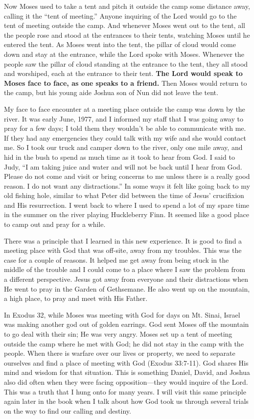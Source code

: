 \documentclass[twoside, 12pt]{book}
\begin{document}
Now Moses used to take a tent and pitch it outside the camp some distance away, calling it the “tent of meeting.” Anyone inquiring of the Lord would go to the tent of meeting outside the camp. And whenever Moses went out to the tent, all the people rose and stood at the entrances to their tents, watching Moses until he entered the tent. As Moses went into the tent, the pillar of cloud would come down and stay at the entrance, while the Lord spoke with Moses. Whenever the people saw the pillar of cloud standing at the entrance to the tent, they all stood and worshiped, each at the entrance to their tent. \textbf{The Lord would speak to Moses face to face, as one speaks to a friend.} Then Moses would return to the camp, but his young aide Joshua son of Nun did not leave the tent.

My face to face encounter at a meeting place outside the camp was down by the river. It was early June, 1977, and I informed my staff that I was going away to pray for a few days; I told them they wouldn't be able to communicate with me. If they had any emergencies they could talk with my wife and she would contact me. So I took our truck and camper down to the river, only one mile away, and hid in the bush to spend as much time as it took to hear from God. I said to Judy, “I am taking juice and water and will not be back until I hear from God. Please do not come and visit or bring concerns to me unless there is a really good reason. I do not want any distractions.” In some ways it felt like going back to my old fishing hole, similar to what Peter did between the time of Jesus' crucifixion and His resurrection. I went back to where I used to spend a lot of my spare time in the summer on the river playing Huckleberry Finn. It seemed like a good place to camp out and pray for a while.

There was a principle that I learned in this new experience. It is good to find a meeting place with God that was off-site, away from my troubles. This was the case for a couple of reasons. It helped me get away from being stuck in the middle of the trouble and I could come to a place where I saw the problem from a different perspective. Jesus got away from everyone and their distractions when He went to pray in the Garden of Gethsemane. He also went up on the mountain, a high place, to pray and meet with His Father. 

In Exodus 32, while Moses was meeting with God for days on Mt. Sinai, Israel was making another god out of golden earrings. God sent Moses off the mountain to go deal with their sin;  He was very angry. Moses set up a tent of meeting outside the camp where he met with God; he did not stay in the camp with the people. When there is warfare over our lives or property, we need to separate ourselves and find a place of meeting with God (Exodus 33:7-11). God shares His mind and wisdom for that situation. This is something Daniel, David, and Joshua also did often when they were facing opposition—they would inquire of the Lord. This was a truth that I hung onto for many years. I will visit this same principle again later in the book when I talk about how God took us through several trials on the way to find our calling and destiny.
\end{document}
